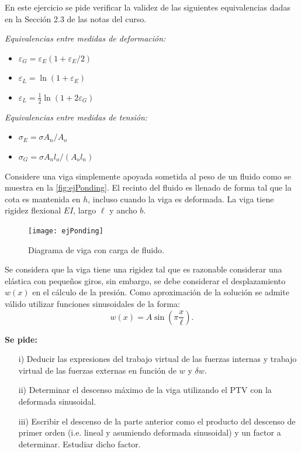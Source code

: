 \bigskip


\begin{exercise}
	
	En este ejercicio se pide verificar la validez de las siguientes equivalencias dadas en la Sección 2.3 de las notas del curso.
	\bigskip
	
	\textit{Equivalencias entre medidas de deformación:}
	
	\begin{itemize}
		\item $\varepsilon_G = \varepsilon_E(1+\varepsilon_E/2)$
		\item $\varepsilon_L = \ln(1+\varepsilon_E)$
		\item $\varepsilon_L = \frac{1}{2}\ln(1+2\varepsilon_G)$
	\end{itemize}
	
	\textit{Equivalencias entre medidas de tensión:}
	
	\begin{itemize}
		\item $\sigma_E = \sigma A_n / A_o$
		\item $\sigma_G = \sigma A_n l_o / (A_o l_n)$
	\end{itemize}
	
\end{exercise}


\bigskip


\begin{exercise}

Considere una viga simplemente apoyada sometida al peso de un fluido como se muestra en la \autoref{fig:ejPonding}. El recinto del fluido es llenado de forma tal que la cota es mantenida en $h$, incluso cuando la viga es deformada. %
%
La viga tiene rigidez flexional $EI$, largo $\ell$ y ancho $b$.

\begin{figure}[htb]
	\centering
\texttt{[image: ejPonding]}
\caption{Diagrama de viga con carga de fluido.}
\label{fig:ejPonding}
\end{figure}


Se considera que la viga tiene una rigidez tal que es razonable considerar una elástica con pequeños giros, sin embargo, se debe considerar el desplazamiento $w(x)$ en el cálculo de la presión. Como aproximación de la solución se admite válido utilizar funciones sinusoidales de la forma:
$$
w(x)=A\sin\left( \pi \frac{x}{\ell} \right).
$$

\textbf{Se pide:}

	\begin{enumerate}
	\item[i)] Deducir las expresiones del trabajo virtual de las fuerzas internas y trabajo virtual de las fuerzas externas en función de $w$ y $\delta w$.
	\item[ii)] Determinar el descenso máximo de la viga utilizando el PTV con la deformada sinusoidal.
	\item[iii)] Escribir el descenso de la parte anterior como el producto del descenso de
	primer orden (i.e. lineal y asumiendo deformada sinusoidal) y un factor a determinar. Estudiar dicho factor.
	\end{enumerate}
\end{exercise}


